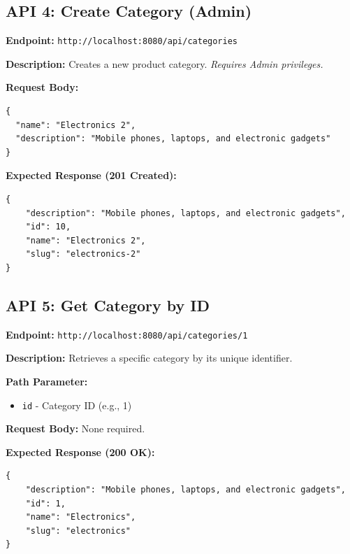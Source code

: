 \documentclass[12pt, a4paper]{article}
\begin{document}
\vspace{0.5cm}

\subsection{API 4: Create Category (Admin)}

\begin{tcolorbox}[colback=postcolor!10, colframe=postcolor, title=POST]
\textbf{Endpoint:} \texttt{http://localhost:8080/api/categories}
\end{tcolorbox}

\textbf{Description:} Creates a new product category. \textit{Requires Admin privileges.}

\textbf{Request Body:}
\begin{lstlisting}
{
  "name": "Electronics 2",
  "description": "Mobile phones, laptops, and electronic gadgets"
}
\end{lstlisting}

\textbf{Expected Response (201 Created):}
\begin{lstlisting}
{
    "description": "Mobile phones, laptops, and electronic gadgets",
    "id": 10,
    "name": "Electronics 2",
    "slug": "electronics-2"
}
\end{lstlisting}

\vspace{0.5cm}

\subsection{API 5: Get Category by ID}

\begin{tcolorbox}[colback=getcolor!10, colframe=getcolor, title=GET]
\textbf{Endpoint:} \texttt{http://localhost:8080/api/categories/1}
\end{tcolorbox}

\textbf{Description:} Retrieves a specific category by its unique identifier.

\textbf{Path Parameter:}
\begin{itemize}
    \item \texttt{id} - Category ID (e.g., 1)
\end{itemize}

\textbf{Request Body:} None required.

\textbf{Expected Response (200 OK):}
\begin{lstlisting}
{
    "description": "Mobile phones, laptops, and electronic gadgets",
    "id": 1,
    "name": "Electronics",
    "slug": "electronics"
}
\end{lstlisting}
\end{document}
